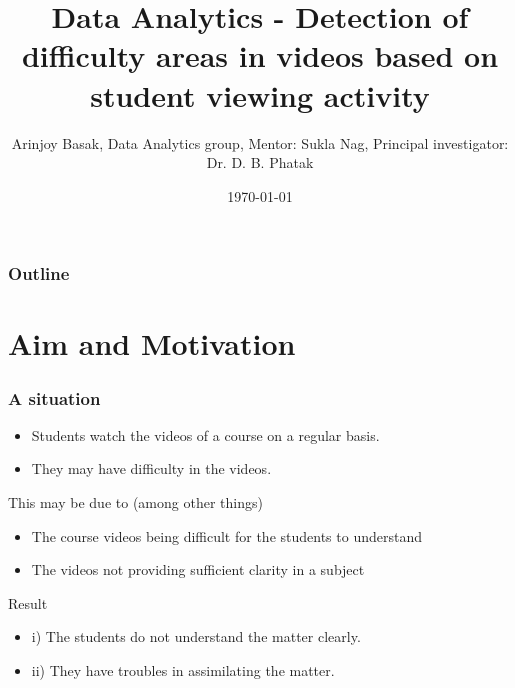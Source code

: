 \documentclass[12pt,xcolor=dvipsnames]{beamer}
\title{Data Analytics - Detection of difficulty areas in videos based on student viewing activity}
\author{Arinjoy Basak, Data Analytics group, Mentor: Sukla Nag, Principal investigator: Dr. D. B. Phatak}
\date{\today}
\begin{document}
\begin{frame}
\titlepage
\end{frame}



\begin{frame}
\frametitle{Outline}

\tableofcontents

\end{frame}

\section{Aim and Motivation}
\begin{frame}[t]
\frametitle{A situation}

\vfill
\begin{itemize}
\item Students watch the videos of a course on a regular basis.
\item They may have difficulty in the videos.
\end{itemize}
This may be due to (among other things)
\begin{itemize}
\item The course videos being difficult for the students to understand
\item The videos not providing sufficient clarity in a subject
\end{itemize}
Result 	
\begin{itemize}
\item i) 	The students do not understand the matter clearly.
\item ii)	They have troubles in assimilating the matter.
\end{itemize}



\end{frame}


\end{document}
